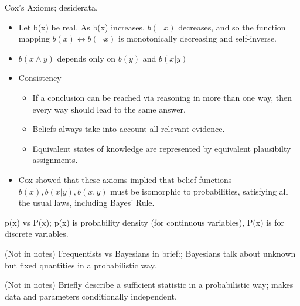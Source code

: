 \documentclass{article}
\begin{document}
Cox's Axioms; desiderata. \begin{itemize} \item Let b(x) be real. As b(x) increases, $b(\neg x)$ decreases, and so the function mapping $b(x) \leftrightarrow b(\neg x)$ is monotonically decreasing and self-inverse.  \item $b(x \wedge y)$ depends only on $b(y)$ and $b(x|y)$ \item Consistency \begin{itemize} \item If a conclusion can be reached via reasoning in more than one way, then every way should lead to the same answer.  \item Beliefs always take into account all relevant evidence.  \item Equivalent states of knowledge are represented by equivalent plausibilty assignments.  \end{itemize} \item Cox showed that these axioms implied that belief functions $b(x), b(x|y), b(x,y)$ must be isomorphic to probabilities, satisfying all the usual laws, including Bayes' Rule.  \end{itemize} 
            
p(x) vs P(x); p(x) is probability density (for continuous variables), P(x) is for discrete variables.

(Not in notes) Frequentists vs Bayesians in brief:; Bayesians talk about unknown but fixed quantities in a probabilistic way.

(Not in notes) Briefly describe a sufficient statistic in a probabilistic way; makes data and parameters conditionally independent.
\end{document}
